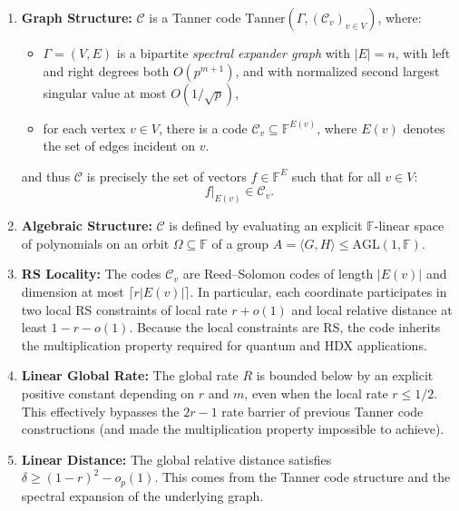 \documentclass[11pt]{article}
\theoremstyle{plain}
\theoremstyle{definition}
\newcommand{\F}{\mathbb{F}}
\begin{document}
\begin{enumerate}
    \item \textbf{Graph Structure:} $\mathcal{C}$ is a Tanner code $\mathrm{Tanner}(\Gamma, (\mathcal{C}_{v})_{v \in V})$, where: 
    \begin{itemize}
        \item $\Gamma = (V, E)$ is a bipartite \emph{spectral expander graph} 
        with $|E| = n$, with left and right degrees both $O(p^{m+1})$, and with normalized second largest singular value at most $O(1/\sqrt{p})$, 
        \item for each vertex $v \in V$, there is a code $\mathcal{C}_v \subseteq \F^{E(v)}$,
        where $E(v)$ denotes the set of edges incident on $v$.
    \end{itemize}
    and thus $\mathcal{C}$ is precisely the set of vectors $f \in \F^E$ such that
        for all $v \in V$:
        $$f|_{E(v)} \in \mathcal{C}_v.$$
        
    
    
    
    \item \textbf{Algebraic Structure:} $\mathcal{C}$ is defined by evaluating an explicit $\mathbb{F}$-linear space of polynomials on an orbit $\Omega\subseteq \mathbb{F}$ of a group $A=\langle G,H\rangle\le \mathrm{AGL}(1,\mathbb{F})$. 
    
    \item \textbf{RS Locality:} The codes $\mathcal{C}_v$ are Reed--Solomon codes of length $|E(v)|$
and dimension at most $\lceil r|E(v)|\rceil$. In particular, each coordinate participates
in two local RS constraints of local rate $r+o(1)$ and local relative distance at least $1-r-o(1)$.
Because the local constraints are RS, the code inherits the multiplication property required
for quantum and HDX applications.

    \item \textbf{Linear Global Rate:} The global rate $R$ is bounded below by an explicit positive constant depending on $r$ and $m$, even when the local rate $r\le 1/2$. This effectively bypasses the $2r-1$ rate barrier of previous Tanner code constructions (and made the multiplication property impossible to achieve).


 \item \textbf{Linear Distance:} The global relative distance satisfies $\delta \ge (1-r)^2 - o_p(1)$. This comes from the Tanner code structure and the spectral expansion of the underlying graph.
\end{enumerate}
\end{document}
